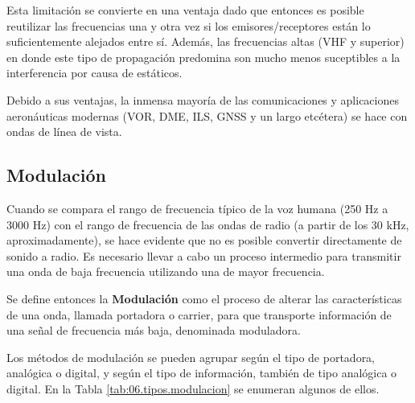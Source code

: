 \begin{description}
Esta limitaci\'on se convierte en una ventaja dado que entonces es posible reutilizar las frecuencias una y otra vez si los emisores/receptores est\'an lo suficientemente alejados entre s\'i. Adem\'as, las frecuencias altas (VHF y superior) en donde este tipo de propagaci\'on predomina son mucho menos suceptibles a la interferencia por causa de est\'aticos.

Debido a sus ventajas, la inmensa mayor\'ia de las comunicaciones y aplicaciones aeron\'auticas modernas (VOR, DME, ILS, GNSS y un largo etc\'etera) se hace con ondas de l\'inea de vista.




\end{description}



\subsection{Modulaci\'on}

Cuando se compara el rango de frecuencia t\'ipico de la voz humana (250 Hz a 3000 Hz) con el rango de frecuencia de las ondas de radio (a partir de los 30 kHz, aproximadamente), se hace evidente que no es posible convertir directamente de sonido a radio. Es necesario llevar a cabo un proceso intermedio para transmitir una onda de baja frecuencia utilizando una de mayor frecuencia.

\begin{tcolorbox}
  Se define entonces la \textbf{Modulaci\'on} como el proceso de
  alterar las caracter\'isticas de una onda, llamada portadora o
  carrier, para que transporte informaci\'on de una se\~nal de frecuencia m\'as baja, denominada moduladora.
\end{tcolorbox}

Los m\'etodos de modulaci\'on se pueden agrupar seg\'un el tipo de portadora, anal\'ogica o digital, y seg\'un el tipo de informaci\'on, tambi\'en de tipo anal\'ogica o digital. En la Tabla \ref{tab:06.tipos.modulacion} se enumeran algunos de ellos.

